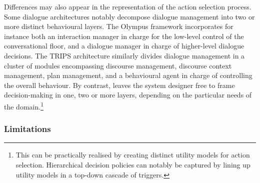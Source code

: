 Differences may also appear in the representation of the action selection process. Some dialogue architectures notably decompose dialogue management into two or more distinct behavioural layers.  The Olympus framework incorporates for instance both an interaction manager in charge for the low-level control of the conversational floor, and a dialogue manager in charge of higher-level dialogue decisions.  The TRIPS architecture similarly divides dialogue management in a cluster of modules encompassing discourse management, discourse context management, plan management, and a behavioural agent in charge of controlling the overall behaviour. By contrast, \opendial leaves the system designer free to frame decision-making in one, two or more layers, depending on the particular needs of the domain.\footnote{This can be practically realised by creating distinct utility models for action selection.  Hierarchical decision policies can notably be captured by lining up utility models in a top-down cascade of triggers.}



\subsubsection*{Limitations}

